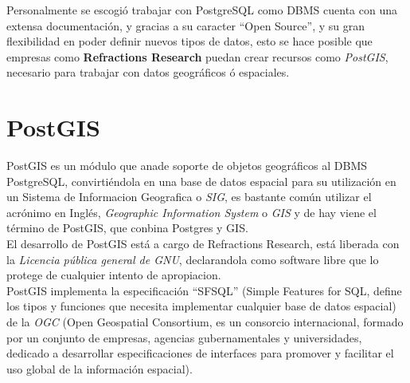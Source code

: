       Personalmente se escogió trabajar con  PostgreSQL como DBMS cuenta con una extensa documentación,  y gracias a su caracter ``Open Source'', y su gran flexibilidad en poder definir nuevos tipos de datos, esto se hace posible que empresas como \textbf{Refractions Research} puedan crear recursos como \emph{PostGIS}, necesario para trabajar con datos geográficos \'o espaciales.




    \section{PostGIS} %
    \label{sec:postgis}

      PostGIS es un módulo  que anade soporte de objetos geográficos al DBMS PostgreSQL, convirtiéndola en una base de datos espacial para su utilización en un Sistema de Informacion Geografica o \emph{SIG}, es bastante común utilizar el acrónimo en Inglés, \emph{Geographic Information System} o \emph{GIS} y de hay viene el término de PostGIS, que conbina Postgres y GIS.\\

      El desarrollo de PostGIS está a cargo de Refractions Research, está liberada con la \emph{Licencia pública general de GNU}, declarandola como software libre que lo protege de cualquier intento de apropiacion.\\

      PostGIS implementa la especificaci\'on ``SFSQL'' (Simple Features for SQL, define los tipos y funciones que necesita implementar cualquier base de datos espacial) de la \emph{OGC} (Open Geospatial Consortium, es un consorcio internacional, formado por un conjunto de empresas, agencias gubernamentales y universidades, dedicado a desarrollar especificaciones de interfaces para promover y facilitar el uso global de la información espacial).\\

